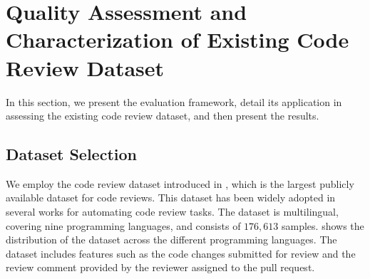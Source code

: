 \section{Quality Assessment and Characterization of Existing Code Review Dataset}
\label{sec:initdata}

In this section, we present the evaluation framework, detail its application in assessing the existing code review dataset, and then present the results.

\subsection{Dataset Selection}
We employ the code review dataset introduced in \cite{li2022automating}, which is the largest publicly available dataset for code reviews. This dataset has been widely adopted in several works \cite{li2022automating, ben2024improving, sghaier2023unity, lu2023llama} for automating code review tasks.
The dataset is multilingual, covering nine programming languages, and consists of $176,613$ samples.  shows the distribution of the dataset across the different programming languages.
The dataset includes features such as the code changes submitted for review and the review comment provided by the reviewer assigned to the pull request. 




